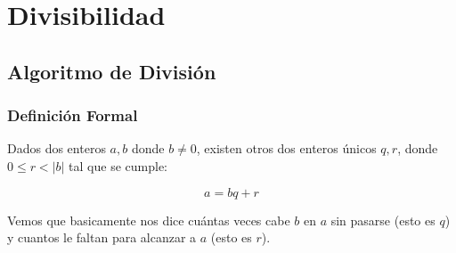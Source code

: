 \documentclass[12pt, fleqn]{report}                             %
\begin{document}
\chapter{Divisibilidad}
    \clearpage

     

    \clearpage
    \section{Algoritmo de División}

        \subsection*{Definición Formal}

            Dados dos enteros $a, b$ donde $b \neq 0$, existen otros dos 
            enteros únicos $q, r$, donde $0 \leq r < |b|$ tal que se cumple:

            \begin{equation}
                a = bq+r
            \end{equation}

            Vemos que basicamente nos dice cuántas veces cabe $b$ en $a$ sin pasarse (esto 
            es $q$) y cuantos le faltan para alcanzar a $a$ (esto es $r$).
\end{document}
